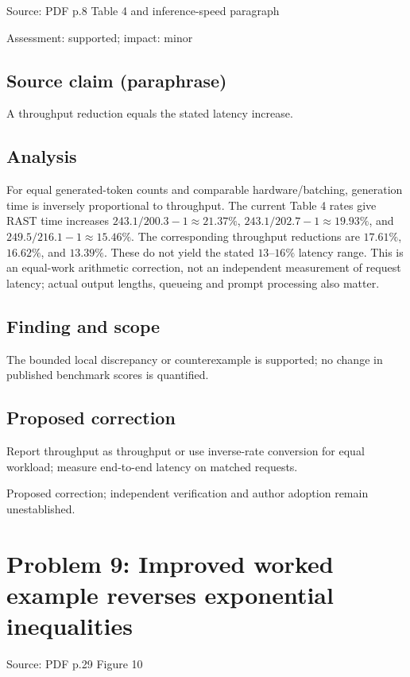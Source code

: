 \documentclass[11pt]{article}
\begin{document}
Source: PDF p.8 Table 4 and inference-speed paragraph

Assessment: supported; impact: minor

\subsection*{Source claim (paraphrase)}

A throughput reduction equals the stated latency increase.

\subsection*{Analysis}

For equal generated-token counts and comparable hardware/batching, generation time is inversely proportional to throughput. The current Table 4 rates give RAST time increases \(243.1/200.3-1\approx21.37\%\), \(243.1/202.7-1\approx19.93\%\), and \(249.5/216.1-1\approx15.46\%\). The corresponding throughput reductions are \(17.61\%\), \(16.62\%\), and \(13.39\%\). These do not yield the stated \(13\)–\(16\%\) latency range. This is an equal-work arithmetic correction, not an independent measurement of request latency; actual output lengths, queueing and prompt processing also matter.

\subsection*{Finding and scope}

The bounded local discrepancy or counterexample is supported; no change in published benchmark scores is quantified.

\subsection*{Proposed correction}

Report throughput as throughput or use inverse-rate conversion for equal workload; measure end-to-end latency on matched requests.

Proposed correction; independent verification and author adoption remain unestablished.

\section*{Problem 9: Improved worked example reverses exponential inequalities}

Source: PDF p.29 Figure 10
\end{document}
